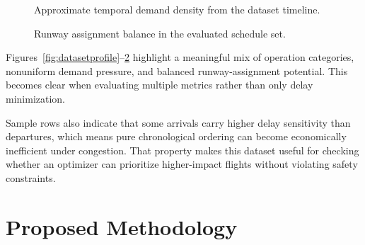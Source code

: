 \documentclass[conference]{IEEEtran}
\begin{document}
\begin{figure}[htbp]
\centering
{}
\caption{Approximate temporal demand density from the dataset timeline.}
\label{fig:demanddensity}
\end{figure}

\begin{figure}[htbp]
\centering
{}
\caption{Runway assignment balance in the evaluated schedule set.}
\label{fig:runwaybalance}
\end{figure}

Figures~\ref{fig:datasetprofile}--\ref{fig:runwaybalance} highlight a meaningful mix of operation categories, nonuniform demand pressure, and balanced runway-assignment potential. This becomes clear when evaluating multiple metrics rather than only delay minimization.

Sample rows also indicate that some arrivals carry higher delay sensitivity than departures, which means pure chronological ordering can become economically inefficient under congestion. That property makes this dataset useful for checking whether an optimizer can prioritize higher-impact flights without violating safety constraints.

\section{Proposed Methodology}
\end{document}
